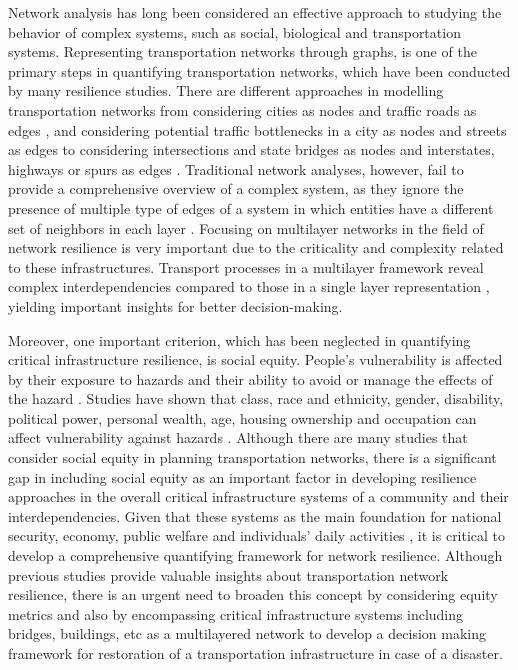 \documentclass[11pt,twoside]{article}
\numberwithin{equation}{section}
\newcommand{\?}{\stackrel{?}{=}}
\begin{document}
Network analysis has long been considered an effective approach to studying the behavior of complex systems, such as
social, biological and transportation systems. Representing transportation networks through graphs, is one of the
primary steps in quantifying transportation networks, which have been conducted by many resilience studies. There are
different approaches in modelling transportation networks from considering cities as nodes and traffic roads as edges
\citep{ip2009resilience}, and considering potential traffic bottlenecks in a city as nodes and streets as edges
\citep{das2020approach} to considering intersections and state bridges as nodes and interstates, highways or spurs as
edges \citep{antony2017developing}.  Traditional network analyses, however, fail to provide a comprehensive overview of
a complex system, as they ignore the presence of multiple type of edges of a system in which entities have a different
set of neighbors in each layer \citep{domenico2013mathematical}. Focusing on multilayer networks in the field of network
resilience is very important due to the criticality and complexity related to these infrastructures. Transport processes
in a multilayer framework reveal complex interdependencies compared to those in a single layer representation
\citep{wu2020traffic}, yielding important insights for better decision-making.

Moreover, one important criterion, which has been neglected in quantifying critical infrastructure resilience, is social
equity. People’s vulnerability is affected by their exposure to hazards and their ability to avoid or manage the effects
of the hazard \citep{cutter1995race}.  Studies have shown that class, race and ethnicity, gender, disability, political
power, personal wealth, age, housing ownership and occupation can affect vulnerability against hazards
\citep{bolin2018race, cutter1995race}. Although there are many studies that consider social equity in planning
transportation networks, there is a significant gap in including social equity as an important factor in developing
resilience approaches in the overall critical infrastructure systems of a community and their interdependencies.  Given
that these systems as the main foundation for national security, economy, public welfare and individuals’ daily
activities \citep{qiang2019empirical}, it is critical to develop a comprehensive quantifying framework for network
resilience. Although previous studies provide valuable insights about transportation network resilience, there is an
urgent need to broaden this concept by considering equity metrics and also by encompassing critical infrastructure
systems including bridges, buildings, etc as a multilayered network to develop a decision making framework for
restoration of a transportation infrastructure in case of a disaster.
\end{document}
